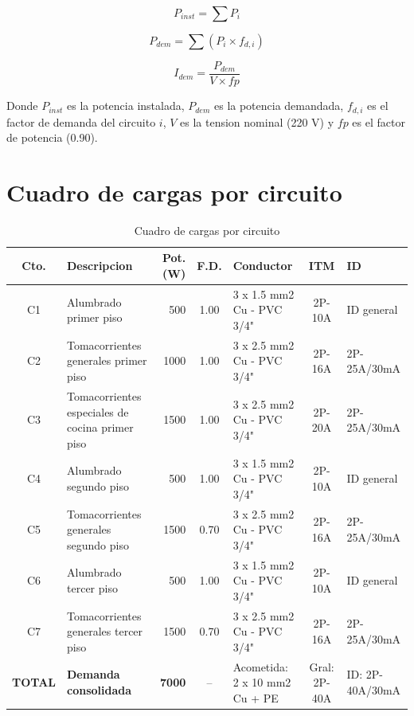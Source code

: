 \begin{equation}
P_{inst} = \sum P_i
\end{equation}

\begin{equation}
P_{dem} = \sum (P_i \times f_{d,i})
\end{equation}

\begin{equation}
I_{dem} = \frac{P_{dem}}{V \times fp}
\end{equation}

Donde $P_{inst}$ es la potencia instalada, $P_{dem}$ es la potencia demandada, $f_{d,i}$ es el factor de demanda del circuito $i$, $V$ es la tension nominal (220 V) y $fp$ es el factor de potencia (0.90).

\section{Cuadro de cargas por circuito}

\begin{table}[H]
\centering
\footnotesize
\setlength{\tabcolsep}{2.5pt}
\caption{Cuadro de cargas por circuito}
\label{tab:cuadro-cargas}
\begin{tabularx}{\textwidth}{c L{3.3cm} r c L{3.1cm} c L{2.2cm}}
\toprule
\textbf{Cto.} & \textbf{Descripcion} & \textbf{Pot. (W)} & \textbf{F.D.} & \textbf{Conductor} & \textbf{ITM} & \textbf{ID} \\
\midrule
C1 & Alumbrado primer piso & 500 & 1.00 & 3 x 1.5 mm2 Cu - PVC 3/4" & 2P-10A & ID general \\
C2 & Tomacorrientes generales primer piso & 1000 & 1.00 & 3 x 2.5 mm2 Cu - PVC 3/4" & 2P-16A & 2P-25A/30mA \\
C3 & Tomacorrientes especiales de cocina primer piso & 1500 & 1.00 & 3 x 2.5 mm2 Cu - PVC 3/4" & 2P-20A & 2P-25A/30mA \\
C4 & Alumbrado segundo piso & 500 & 1.00 & 3 x 1.5 mm2 Cu - PVC 3/4" & 2P-10A & ID general \\
C5 & Tomacorrientes generales segundo piso & 1500 & 0.70 & 3 x 2.5 mm2 Cu - PVC 3/4" & 2P-16A & 2P-25A/30mA \\
C6 & Alumbrado tercer piso & 500 & 1.00 & 3 x 1.5 mm2 Cu - PVC 3/4" & 2P-10A & ID general \\
C7 & Tomacorrientes generales tercer piso & 1500 & 0.70 & 3 x 2.5 mm2 Cu - PVC 3/4" & 2P-16A & 2P-25A/30mA \\
\midrule
\textbf{TOTAL} & \textbf{Demanda consolidada} & \textbf{7000} & -- & Acometida: 2 x 10 mm2 Cu + PE & Gral: 2P-40A & ID: 2P-40A/30mA \\
\bottomrule
\end{tabularx}
\end{table}

